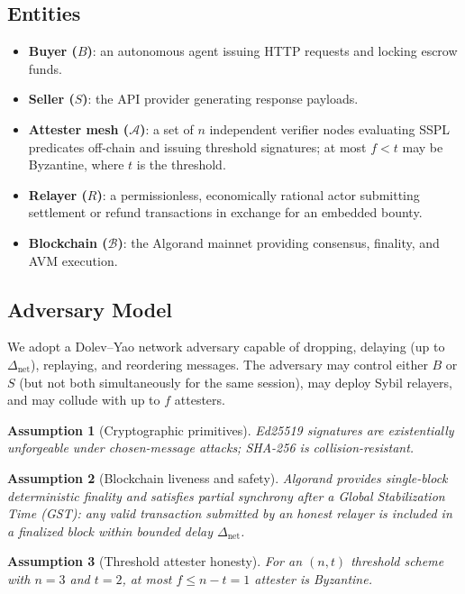 \documentclass[journal]{IEEEtran}
\newtheorem{assumption}{Assumption}
\newcommand{\set}[1]{\mathcal{#1}}
\begin{document}
\subsection{Entities}
\begin{itemize}[leftmargin=*]
    \item \textbf{Buyer ($B$)}: an autonomous agent issuing HTTP requests and locking escrow funds.
    \item \textbf{Seller ($S$)}: the API provider generating response payloads.
    \item \textbf{Attester mesh ($\set{A}$)}: a set of $n$ independent verifier nodes evaluating SSPL predicates off-chain and issuing threshold signatures; at most $f < t$ may be Byzantine, where $t$ is the threshold.
    \item \textbf{Relayer ($R$)}: a permissionless, economically rational actor submitting settlement or refund transactions in exchange for an embedded bounty.
    \item \textbf{Blockchain ($\set{B}$)}: the Algorand mainnet providing consensus, finality, and AVM execution.
\end{itemize}

\subsection{Adversary Model}
We adopt a Dolev--Yao network adversary capable of dropping, delaying (up to $\Delta_{\text{net}}$), replaying, and reordering messages. The adversary may control either $B$ or $S$ (but not both simultaneously for the same session), may deploy Sybil relayers, and may collude with up to $f$ attesters.

\begin{assumption}[Cryptographic primitives]
\label{asm:crypto}
Ed25519 signatures are existentially unforgeable under chosen-message attacks; SHA-256 is collision-resistant.
\end{assumption}

\begin{assumption}[Blockchain liveness and safety]
\label{asm:chain}
Algorand provides single-block deterministic finality and satisfies partial synchrony after a Global Stabilization Time (GST): any valid transaction submitted by an honest relayer is included in a finalized block within bounded delay $\Delta_{\text{net}}$.
\end{assumption}

\begin{assumption}[Threshold attester honesty]
\label{asm:threshold}
For an $(n, t)$ threshold scheme with $n = 3$ and $t = 2$, at most $f \le n - t = 1$ attester is Byzantine.
\end{assumption}
\end{document}
